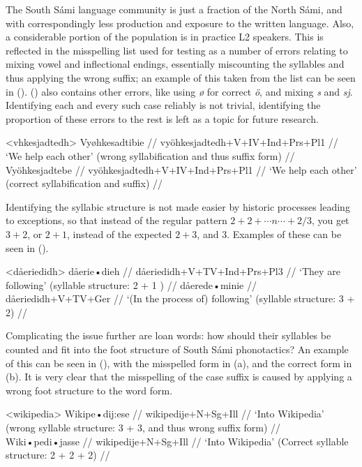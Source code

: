 \documentclass{flammie}
\begin{document}
The South Sámi language community is just a fraction of the North Sámi, and with
correspondingly less production and exposure to the written language. Also, a
considerable portion of the population is in practice L2 speakers. This is
reflected in the misspelling list used for testing as a number of errors
relating to mixing vowel and inflectional endings, essentially miscounting the
syllables and thus applying the wrong suffix; an example of this taken from the
list can be seen in (\nextx). (\nextx) also contains other errors, like using
\textit{ø} for correct \textit{ö}, and mixing \textit{s} and \textit{sj}.
Identifying each and every such case reliably is not trivial, identifying the
proportion of these errors to the rest is left as a topic for future research.

\pex<vhkesjadtedh>
\a
\begingl
\gla *Vyøhkesadtibie //
\glb vyöhkesjadtedh+V+IV+Ind+Prs+Pl1 //
\glft `We help each other' (wrong syllabification and thus suffix form) //
\endgl
\a
\begingl
\gla Vyöhkesjadtebe //
\glb vyöhkesjadtedh+V+IV+Ind+Prs+Pl1 //
\glft `We help each other' (correct syllabification and suffix) //
\endgl
\xe

Identifying the syllabic structure is not made easier by historic processes
leading to exceptions, so that instead of the regular pattern $2+2+\cdots
n\cdots +2/3$, you get $3+2$, or $2+1$, instead of the expected $2+3$, and $3$.
Examples of these can be seen in (\nextx).

\pex<dåeriedidh>
\a
\begingl
\gla dåerie•dieh //
\glb dåeriedidh+V+TV+Ind+Prs+Pl3 //
\glft `They are following' (syllable structure: 2 + 1 ) //
\endgl
\a
\begingl
\gla dåerede•minie //
\glb dåeriedidh+V+TV+Ger //
\glft `(In the process of) following' (syllable structure: 3 + 2) //
\endgl
\xe


Complicating the issue further are loan words: how should their syllables be
counted and fit into the foot structure of South Sámi phonotactics? An example
of this can be seen in (\nextx), with the misspelled form in (\nextx a), and the
correct form in (\nextx b). It is very clear that the misspelling of the case
suffix is caused by applying a wrong foot structure to the word form.

\pex<wikipedia>
\a
\begingl
\gla Wikipe•dij:ese //
\glb wikipedije+N+Sg+Ill //
\glft `Into Wikipedia' (wrong syllable structure: 3 + 3, and thus wrong suffix form) //
\endgl
\a
\begingl
\gla Wiki•pedi•jasse //
\glb wikipedije+N+Sg+Ill //
\glft `Into Wikipedia' (Correct syllable structure: 2 + 2 + 2) //
\endgl
\xe
\end{document}
